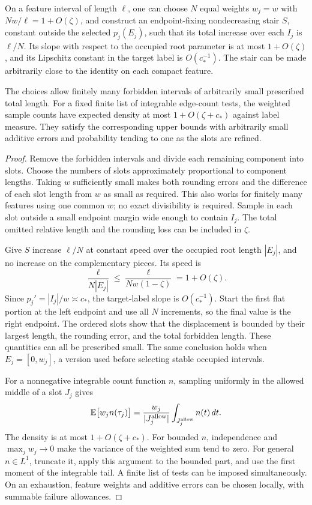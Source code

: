 \begin{lemma}\label{wl:stairs}
On a feature interval of length $\ell$, one can choose $N$ equal
weights $w_j=w$ with $Nw/\ell=1+O(\zeta)$, and construct an
endpoint-fixing nondecreasing stair $S$, constant outside the selected
$p_j(E_j)$, such that its total increase over each $I_j$ is $\ell/N$.
Its slope with respect to the occupied root parameter is at most
$1+O(\zeta)$, and its Lipschitz constant in the target label is
$O(c_*^{-1})$.  The stair can be made arbitrarily close to the identity
on each compact feature.

The choices allow finitely many forbidden intervals of arbitrarily
small prescribed total length.  For a fixed finite list of integrable
edge-count tests, the weighted sample counts have expected density at
most $1+O(\zeta+c_*)$ against label measure.  They satisfy the
corresponding upper bounds with arbitrarily small additive errors and
probability tending to one as the slots are refined.
\end{lemma}

\begin{proof}
Remove the forbidden intervals and divide each remaining component
into slots.  Choose the numbers of slots approximately proportional to
component lengths.  Taking $w$ sufficiently small makes both rounding
errors and the difference of each slot length from $w$ as small as
required.  This also works for finitely many features using one common
$w$; no exact divisibility is required.  Sample in each slot outside a
small endpoint margin wide enough to contain $I_j$.  The total omitted
relative length and the rounding loss can be included in $\zeta$.

Give $S$ increase $\ell/N$ at constant speed over the occupied
root length $|E_j|$, and no increase on the complementary pieces.
Its speed is
\[
 \frac{\ell}{N|E_j|}\leq
 \frac{\ell}{Nw(1-\zeta)}=1+O(\zeta).
\]
Since $p_j'=|I_j|/w\asymp c_*$, the target-label slope is
$O(c_*^{-1})$.  Start the first flat portion at the left endpoint and
use all $N$ increments, so the final value is the right endpoint.
The ordered slots show that the displacement is bounded by their
largest length, the rounding error, and the total forbidden length.
These quantities can all be prescribed small.  The same conclusion
holds when $E_j=[0,w_j]$, a version used before selecting stable
occupied intervals.

For a nonnegative integrable count function $n$, sampling uniformly in
the allowed middle of a slot $J_j$ gives
\[
 \mathbb E\bigl[w_j n(\tau_j)\bigr]
 =\frac{w_j}{|J_j^{\rm allow}|}
       \int_{J_j^{\rm allow}}n(t)\,dt.
\]
The density is at most $1+O(\zeta+c_*)$.  For bounded $n$, independence
and $\max_jw_j\to0$ make the variance of the weighted sum tend to
zero.  For general $n\in L^1$, truncate it, apply this argument to the
bounded part, and use the first moment of the integrable tail.  A
finite list of tests can be imposed simultaneously.  On an exhaustion,
feature weights and additive errors can be chosen locally, with
summable failure allowances.
\end{proof}

